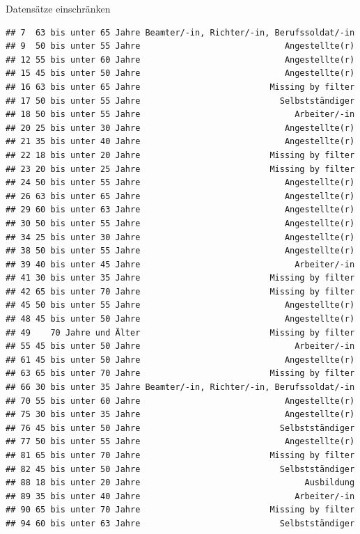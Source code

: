 \documentclass[ignorenonframetext,]{beamer}
\begin{document}
\begin{frame}[fragile]{Datensätze einschränken}
\begin{verbatim}
## 7  63 bis unter 65 Jahre Beamter/-in, Richter/-in, Berufssoldat/-in
## 9  50 bis unter 55 Jahre                             Angestellte(r)
## 12 55 bis unter 60 Jahre                             Angestellte(r)
## 15 45 bis unter 50 Jahre                             Angestellte(r)
## 16 63 bis unter 65 Jahre                          Missing by filter
## 17 50 bis unter 55 Jahre                            Selbstständiger
## 18 50 bis unter 55 Jahre                               Arbeiter/-in
## 20 25 bis unter 30 Jahre                             Angestellte(r)
## 21 35 bis unter 40 Jahre                             Angestellte(r)
## 22 18 bis unter 20 Jahre                          Missing by filter
## 23 20 bis unter 25 Jahre                          Missing by filter
## 24 50 bis unter 55 Jahre                             Angestellte(r)
## 26 63 bis unter 65 Jahre                             Angestellte(r)
## 29 60 bis unter 63 Jahre                             Angestellte(r)
## 30 50 bis unter 55 Jahre                             Angestellte(r)
## 34 25 bis unter 30 Jahre                             Angestellte(r)
## 38 50 bis unter 55 Jahre                             Angestellte(r)
## 39 40 bis unter 45 Jahre                               Arbeiter/-in
## 41 30 bis unter 35 Jahre                          Missing by filter
## 42 65 bis unter 70 Jahre                          Missing by filter
## 45 50 bis unter 55 Jahre                             Angestellte(r)
## 48 45 bis unter 50 Jahre                             Angestellte(r)
## 49    70 Jahre und Älter                          Missing by filter
## 55 45 bis unter 50 Jahre                               Arbeiter/-in
## 61 45 bis unter 50 Jahre                             Angestellte(r)
## 63 65 bis unter 70 Jahre                          Missing by filter
## 66 30 bis unter 35 Jahre Beamter/-in, Richter/-in, Berufssoldat/-in
## 70 55 bis unter 60 Jahre                             Angestellte(r)
## 75 30 bis unter 35 Jahre                             Angestellte(r)
## 76 45 bis unter 50 Jahre                            Selbstständiger
## 77 50 bis unter 55 Jahre                             Angestellte(r)
## 81 65 bis unter 70 Jahre                          Missing by filter
## 82 45 bis unter 50 Jahre                            Selbstständiger
## 88 18 bis unter 20 Jahre                                 Ausbildung
## 89 35 bis unter 40 Jahre                               Arbeiter/-in
## 90 65 bis unter 70 Jahre                          Missing by filter
## 94 60 bis unter 63 Jahre                            Selbstständiger

\end{verbatim}
\end{frame}
\end{document}
